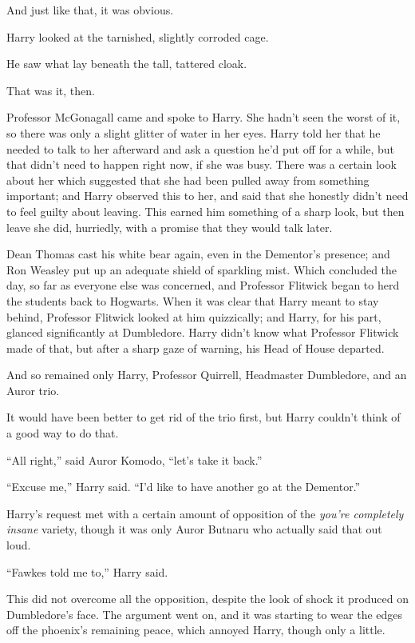 And just like that, it was obvious.

Harry looked at the tarnished, slightly corroded cage.

He saw what lay beneath the tall, tattered cloak.

That was it, then.

Professor McGonagall came and spoke to Harry. She hadn’t seen the worst of it, so there was only a slight glitter of water in her eyes. Harry told her that he needed to talk to her afterward and ask a question he’d put off for a while, but that didn’t need to happen right now, if she was busy. There was a certain look about her which suggested that she had been pulled away from something important; and Harry observed this to her, and said that she honestly didn’t need to feel guilty about leaving. This earned him something of a sharp look, but then leave she did, hurriedly, with a promise that they would talk later.

Dean Thomas cast his white bear again, even in the Dementor’s presence; and Ron Weasley put up an adequate shield of sparkling mist. Which concluded the day, so far as everyone else was concerned, and Professor Flitwick began to herd the students back to Hogwarts. When it was clear that Harry meant to stay behind, Professor Flitwick looked at him quizzically; and Harry, for his part, glanced significantly at Dumbledore. Harry didn’t know what Professor Flitwick made of that, but after a sharp gaze of warning, his Head of House departed.

And so remained only Harry, Professor Quirrell, Headmaster Dumbledore, and an Auror trio.

It would have been better to get rid of the trio first, but Harry couldn’t think of a good way to do that.

“All right,” said Auror Komodo, “let’s take it back.”

“Excuse me,” Harry said. “I’d like to have another go at the Dementor.”

\later

Harry’s request met with a certain amount of opposition of the \emph{you’re completely insane} variety, though it was only Auror Butnaru who actually said that out loud.

“Fawkes told me to,” Harry said.

This did not overcome all the opposition, despite the look of shock it produced on Dumbledore’s face. The argument went on, and it was starting to wear the edges off the phoenix’s remaining peace, which annoyed Harry, though only a little.

